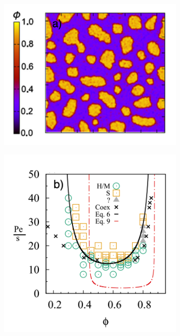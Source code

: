 \documentclass[11pt]{article}
\begin{document}
\begin{figure}[ht]
     \centering
     \begin{subfigure}[b]{0.5\textwidth}
         \centering
         \includegraphics[width=\textwidth]{Screen Shot 2020-08-12 at 9.24.03 AM (1).png}
         \label{fig:mips}
     \end{subfigure}
     \hfill
     \begin{subfigure}[b]{0.45\textwidth}
         \centering
         \includegraphics[width=\textwidth]{Screen Shot 2020-08-12 at 11.49.03 AM.png}

\end{subfigure}
\end{figure}
\end{document}
